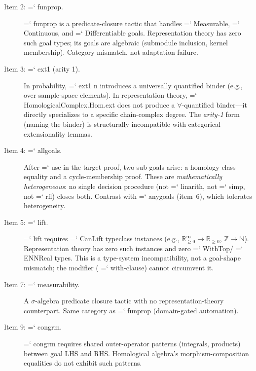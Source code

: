 \documentclass[11pt]{article}
\renewcommand{\texttt}[1]{%
  \begingroup\ttfamily\hyphenchar\font=`\-\relax
  \def\_{\textunderscore\discretionary{}{}{}}%
  #1\endgroup}
\theoremstyle{definition}
\theoremstyle{remark}
\begin{document}
\begin{description}
\item[Item 2: \texttt{fun\_prop}.]
  \texttt{fun\_prop} is a predicate-closure tactic that handles
  \texttt{Measurable}, \texttt{Continuous}, and \texttt{Differentiable}
  goals.  Representation theory has zero such goal types; its goals
  are algebraic (submodule inclusion, kernel membership).  Category
  mismatch, not adaptation failure.

\item[Item 3: \texttt{ext1} (arity 1).]
  In probability, \texttt{ext1 n} introduces a universally quantified
  binder (e.g., over sample-space elements).  In representation
  theory, \texttt{HomologicalComplex.Hom.ext} does not produce a
  $\forall$-quantified binder---it directly specializes to a
  specific chain-complex degree.  The \emph{arity-1} form
  (naming the binder) is structurally incompatible with categorical
  extensionality lemmas.

\item[Item 4: \texttt{all\_goals}.]
  After \texttt{use} in the target proof, two sub-goals arise:
  a homology-class equality and a cycle-membership proof.  These
  are \emph{mathematically heterogeneous}: no single decision
  procedure (not \texttt{linarith}, not \texttt{simp}, not
  \texttt{rfl}) closes both.  Contrast with \texttt{any\_goals}
  (item~6), which tolerates heterogeneity.

\item[Item 5: \texttt{lift}.]
  \texttt{lift} requires \texttt{CanLift} typeclass instances
  (e.g., $\mathbb{R}_{\geq 0}^\infty \to \mathbb{R}_{\geq 0}$,
  $\mathbb{Z} \to \mathbb{N}$).  Representation theory has
  zero such instances and zero \texttt{WithTop}/\texttt{ENNReal}
  types.  This is a type-system incompatibility, not a
  goal-shape mismatch; the modifier (\texttt{with}-clause)
  cannot circumvent it.

\item[Item 7: \texttt{measurability}.]
  A $\sigma$-algebra predicate closure tactic with no
  representation-theory counterpart.  Same category as
  \texttt{fun\_prop} (domain-gated automation).

\item[Item 9: \texttt{congrm}.]
  \texttt{congrm} requires shared outer-operator patterns
  (integrals, products) between goal LHS and RHS.  Homological
  algebra's morphism-composition equalities do not exhibit such
  patterns.
\end{description}
\end{document}
